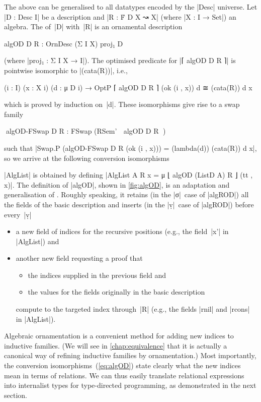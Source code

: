 The above can be generalised to all datatypes encoded by the |Desc| universe.
Let |D : Desc I| be a description and |R : Ḟ D X ↝ X| (where |X : I → Set|) an algebra.
The  of~|D| with~|R| is an ornamental description
\begin{code}
algOD D R : OrnDesc (Σ I X) proj₁ D
\end{code}
(where |proj₁ : Σ I X → I|).
The optimised predicate for |⌈ algOD D R ⌉| is pointwise isomorphic to |(cata(R))|, i.e.,
\begin{code}
(i : I) (x : X i) (d : μ D i) → OptP ⌈ algOD D R ⌉ (ok (i , x)) d ≅ (cata(R)) d x
\end{code}
which is proved by induction on~|d|.
These isomorphisms give rise to a swap family
\begin{code}
^^^algOD-FSwap D R : FSwap (RSem' ⌈ algOD D R ⌉)
\end{code}
such that |Swap.P (algOD-FSwap D R (ok (i , x))) = (lambda(d)) (cata(R)) d x|, so we arrive at the following conversion isomorphisms
|AlgList| is obtained by defining |AlgList A R x = μ ⌊ algOD (ListD A) R ⌋ (tt , x)|.
The definition of |algOD|, shown in \autoref{fig:algOD}, is an adaptation and generalisation of .
Roughly speaking, it retains (in the |σ|~case of |algROD|) all the fields of the basic description and inserts (in the |ṿ|~case of |algROD|) before every~|ṿ|
\begin{itemize}
\item a new field of indices for the recursive positions (e.g., the field~|x'| in |AlgList|) and
\item another new field requesting a proof that
\begin{itemize}
\item the indices supplied in the previous field and 
\item the values for the fields originally in the basic description
\end{itemize}
compute to the targeted index through~|R| (e.g., the fields |rnil| and |rcons| in |AlgList|).
\end{itemize}

Algebraic ornamentation is a convenient method for adding new indices to inductive families.
(We will see in \autoref{chap:equivalence} that it is actually a canonical way of refining inductive families by ornamentation.)
Most importantly, the conversion isomorphisms~(\ref{eq:algOD}) state clearly what the new indices mean in terms of relations.
We can thus easily translate relational expressions into internalist types for type-directed programming, as demonstrated in the next section.

